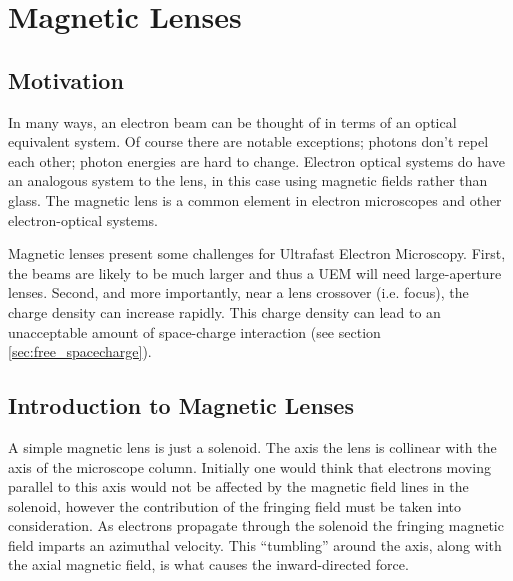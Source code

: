 
\section{Magnetic Lenses} \label{sec:mag_lens}

\subsection{Motivation}

In many ways, an electron beam can be thought of in terms of an optical equivalent system. 
Of course there are notable exceptions; photons don't repel each other; photon energies are hard to change.
Electron optical systems do have an analogous system to the lens, in this case using magnetic fields rather than glass. 
The magnetic lens is a common element in electron microscopes and other electron-optical systems.

Magnetic lenses present some challenges for Ultrafast Electron Microscopy.
First, the beams are likely to be much larger and thus a UEM will need large-aperture lenses.
Second, and more importantly, near a lens crossover (i.e. focus), the charge density can increase rapidly.
This charge density can lead to an unacceptable amount of space-charge interaction (see section \ref{sec:free_spacecharge}).

\subsection{Introduction to Magnetic Lenses} 

A simple magnetic lens is just a solenoid.
The axis the lens is collinear with the axis of the microscope column.
Initially one would think that electrons moving parallel to this axis would not be affected by the magnetic field lines in the solenoid, however the contribution of the fringing field must be taken into consideration.
As electrons propagate through the solenoid the fringing magnetic field imparts an azimuthal velocity.
This ``tumbling'' around the axis, along with the axial magnetic field, is what causes the inward-directed force. 

